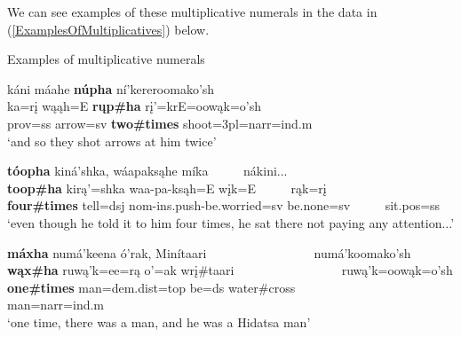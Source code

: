 We can see examples of these multiplicative numerals in the data in (\ref{ExamplesOfMultiplicatives}) below.

\begin{exe}

\item\label{ExamplesOfMultiplicatives} Examples of multiplicative numerals

\begin{xlist}

\item\label{ExamplesOfMultiplicatives2} \glll káni máahe \textbf{núpha} ní'kereroomako'sh\\
    ka=rį wąąh=E \textbf{rųp\#ha} rį'=krE=oowąk=o'sh\\
    \textnormal{prov}=ss \textnormal{arrow}=sv \textbf{\textnormal{\bfseries two}\#\textnormal{\bfseries times}} \textnormal{shoot}=3pl=narr=ind.m\\
    \glt `and so they shot arrows at him twice' \citep[298]{hollow1973b} 

\item\label{ExamplesOfMultiplicatives1} \glll \textbf{tóopha} kiná'shka, wáapaksąhe míka ~ ~ ~ nákini...\\
    \textbf{toop\#ha} kirą'=shka waa-pa-ksąh=E wįk=E ~ ~ ~ rąk=rį\\
    \textbf{\textnormal{\bfseries four}\#\textnormal{\bfseries times}} \textnormal{tell}=dsj nom-ins.push-\textnormal{be.worried}=sv \textnormal{be.none}=sv ~ ~ ~  sit.pos=ss\\
    \glt `even though he told it to him four times, he sat there not paying any attention...' \citep[156]{hollow1973a}
    

\item\label{ExamplesOfMultiplicatives3} \glll \textbf{máxha} numá'keena ó'rak, Minítaari ~ ~ ~ ~ ~ ~ ~ ~ ~ ~ numá'koomako'sh\\
    \textbf{wąx\#ha} ruwą'k=ee=rą o'=ak wrį\#taari ~ ~ ~ ~ ~ ~ ~ ~ ~ ~  ruwą'k=oowąk=o'sh\\
    \textbf{\textnormal{\bfseries one}\#\textnormal{\bfseries times}} \textnormal{man}=dem.dist=top \textnormal{be}=ds \textnormal{water}\#\textnormal{cross} ~ ~ ~ ~ ~ ~ ~ ~ ~ ~  \textnormal{man}=narr=ind.m\\
    \glt `one time, there was a man, and he was a Hidatsa man' \citep[11]{trechter2012}

\end{xlist}

\end{exe}


